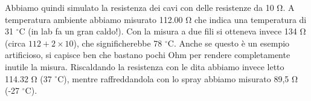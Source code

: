 Abbiamo quindi simulato la resistenza dei cavi con delle resistenze da 10 \si{\ohm}. A temperatura ambiente abbiamo misurato
112.00 \si{\ohm} che indica una temperatura di 31 $^\circ$C (in lab fa un gran caldo!). Con la misura a due fili si otteneva 
invece 134 \si{\ohm} (circa $112 + 2 \times 10$), che significherebbe 78 $^\circ$C. Anche se questo è un esempio artificioso,
si capisce ben che bastano pochi Ohm per rendere completamente inutile la misura. Riscaldando la resistenza con le dita abbiamo
invece letto 114.32 \si{\ohm} (37 $^\circ$C), mentre raffreddandola con lo spray abbiamo misurato 89,5 \si{\ohm} (-27 $^\circ$C).
